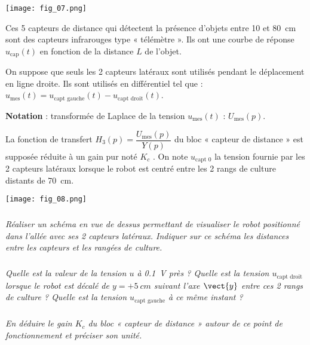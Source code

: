 \begin{multicols}{2}
\begin{center}
\texttt{[image: fig\_07.png]}
\end{center}

Ces 5 capteurs de distance qui détectent la présence d’objets entre 10 et \SI{80}{cm} sont des capteurs infrarouges type « télémètre ». Ils ont une courbe de réponse $u_{\text{cap}} (t)$ en fonction de la  distance $L$ de l’objet. 

On suppose que seuls les 2 capteurs latéraux sont utilisés pendant le déplacement en ligne droite. Ils sont utilisés en différentiel tel que :  $u_{\text{mes}}(t) = u_{\text{capt gauche}}(t) - u_{\text{capt droit}}(t)$.  

\textbf{Notation} : transformée de Laplace de la tension $u_{\text{mes}} (t)$ : $U_{\text{mes}} (p)$. 

La fonction de transfert $H_3(p) = \dfrac{U_{\text{mes}}(p)}{Y(p)}$ du bloc « capteur de distance » est supposée réduite à un gain pur noté $K_c$ . On note $u_{\text{capt 0}}$ la tension fournie par les 2 capteurs latéraux lorsque le robot est centré entre les 2 rangs de culture distants de \SI{70}{cm}. 

\begin{center}
\texttt{[image: fig\_08.png]}
\end{center}

\subparagraph{}
\textit{Réaliser un schéma en vue de dessus permettant de visualiser le robot positionné dans l’allée avec ses 2 capteurs latéraux. Indiquer sur ce schéma les distances entre les capteurs et les rangées de culture.}
\ifprof
\begin{corrige}
\end{corrige}
\else
\fi


\subparagraph{}
\textit{Quelle est la valeur de la tension $u$ à \SI{0,1}{V} près ? Quelle est la tension $u_{\text{capt droit}}$ lorsque le robot est décalé de $y = +\SI{5}{cm}$ suivant l’axe $\vect{y}$ entre ces 2 rangs de culture ? Quelle est la tension $u_{\text{capt gauche}}$ à ce même instant ? }
\ifprof
\begin{corrige}
\end{corrige}
\else
\fi


\subparagraph{}
\textit{En déduire le gain $K_c$ du bloc « capteur de distance » autour de ce point de fonctionnement et préciser son unité.}
\ifprof
\begin{corrige}
\end{corrige}
\else
\fi



\end{multicols}
